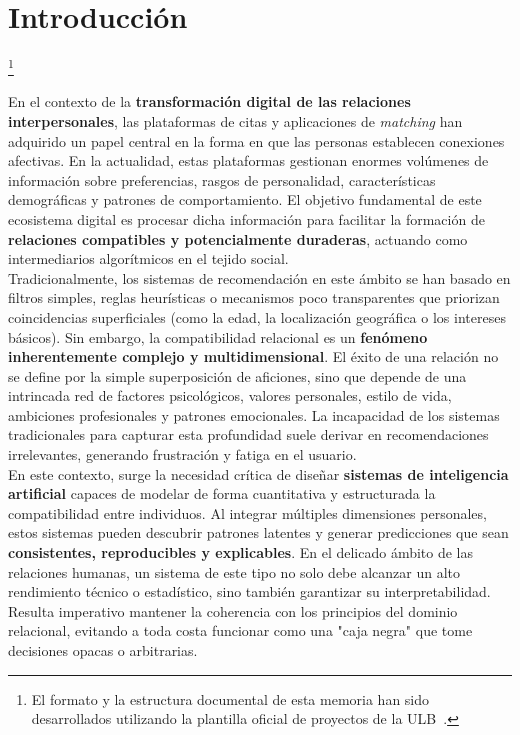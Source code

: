 \setcounter{secnumdepth}{-1}

\chapter{Introducción}\footnote{El formato y la estructura documental de esta memoria han sido desarrollados utilizando la plantilla oficial de proyectos de la ULB~\cite{ulb_template}.}

En el contexto de la \textbf{transformación digital de las relaciones interpersonales}, las plataformas de citas y aplicaciones de \textit{matching} han adquirido un papel central en la forma en que las personas establecen conexiones afectivas. En la actualidad, estas plataformas gestionan enormes volúmenes de información sobre preferencias, rasgos de personalidad, características demográficas y patrones de comportamiento. El objetivo fundamental de este ecosistema digital es procesar dicha información para facilitar la formación de \textbf{relaciones compatibles y potencialmente duraderas}, actuando como intermediarios algorítmicos en el tejido social.\\

Tradicionalmente, los sistemas de recomendación en este ámbito se han basado en filtros simples, reglas heurísticas o mecanismos poco transparentes que priorizan coincidencias superficiales (como la edad, la localización geográfica o los intereses básicos). Sin embargo, la compatibilidad relacional es un \textbf{fenómeno inherentemente complejo y multidimensional}. El éxito de una relación no se define por la simple superposición de aficiones, sino que depende de una intrincada red de factores psicológicos, valores personales, estilo de vida, ambiciones profesionales y patrones emocionales. La incapacidad de los sistemas tradicionales para capturar esta profundidad suele derivar en recomendaciones irrelevantes, generando frustración y fatiga en el usuario.\\

En este contexto, surge la necesidad crítica de diseñar \textbf{sistemas de inteligencia artificial} capaces de modelar de forma cuantitativa y estructurada la compatibilidad entre individuos. Al integrar múltiples dimensiones personales, estos sistemas pueden descubrir patrones latentes y generar predicciones que sean \textbf{consistentes, reproducibles y explicables}. En el delicado ámbito de las relaciones humanas, un sistema de este tipo no solo debe alcanzar un alto rendimiento técnico o estadístico, sino también garantizar su interpretabilidad. Resulta imperativo mantener la coherencia con los principios del dominio relacional, evitando a toda costa funcionar como una "caja negra" que tome decisiones opacas o arbitrarias.\\

